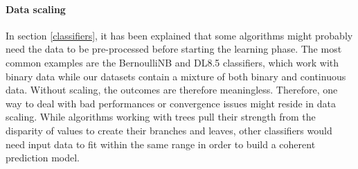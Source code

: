 \paragraph{Data scaling} \label{data_scaling}

In section \ref{classifiers}, it has been explained that some algorithms might probably need the data to be pre-processed before starting the learning phase. The most common examples are the BernoulliNB and DL8.5 classifiers, which work with binary data while our datasets contain a mixture of both binary and continuous data. Without scaling, the outcomes are therefore meaningless. Therefore, one way to deal with bad performances or convergence issues might reside in data scaling. While algorithms working with trees pull their strength from the disparity of values to create their branches and leaves, other classifiers would need input data to fit within the same range in order to build a coherent prediction model.

